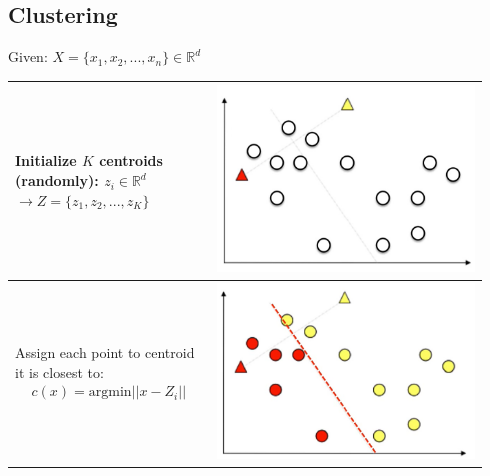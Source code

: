 \subsection{Clustering}
    Given: $X = \{x_1, x_2, ..., x_n\} \in \mathbb{R}^d$\\
    \begin{tabular}{m{0.4\linewidth} | m{0.54\linewidth}}
        Initialize $K$ centroids (randomly): $z_i \in \mathbb{R}^d$ $\rightarrow Z = \{z_1, z_2, ..., z_K\}$ & \begin{minipage}{\linewidth}\includegraphics[width = \linewidth]{src/8_ml/images/cluster_centroid_placing.png}\end{minipage}\\
        \hline
        Assign each point to centroid it is closest to:
        \begin{align*}
            c(x) = \text{argmin}||x - Z_i||
        \end{align*}
        & \includegraphics[width = \linewidth]{src/8_ml/images/cluster_assign_points.png}\\

\end{tabular}

